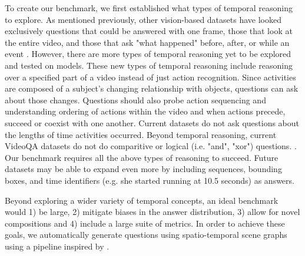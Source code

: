 \documentclass{article}
\newcommand{\mgm}[1]{{\color{cyan}{mgm: #1}}}
\begin{document}
To create our benchmark, we first established what types of temporal reasoning to explore. As mentioned previously, other vision-based datasets have looked exclusively questions that could be answered with one frame, those that look at the entire video, and those that ask "what happened" before, after, or while an event  \cite{tapaswi2016movieqa, lei2018tvqa, jang2017tgif, kim2017deepstory, xu2017video, maharaj2017dataset, zeng2016leveraging, yu2019activitynet}. However, there are more types of temporal reasoning yet to be explored and tested on models. These new types of temporal reasoning include reasoning over a specified part of a video instead of just action recognition. \mgm{rewrite sentence} Since activities are composed of a subject's changing relationship with objects, questions can ask about those changes. Questions should also probe action sequencing and understanding ordering of actions within the video and when actions precede, succeed or coexist with one another. Current datasets do not ask questions about the lengths of time activities occurred. Beyond temporal reasoning, current VideoQA datasets do not do comparitive or logical (i.e. "and", "xor") questions. \mgm{VG figure and talk about a little bit}. Our benchmark requires all the above types of reasoning to succeed. Future datasets may be able to expand even more by including sequences, bounding boxes, and time identifiers (e.g. she started running at 10.5 seconds) as answers.\mgm{I think make this a bullet list. Too weird for transition words}

Beyond exploring a wider variety of temporal concepts, an ideal benchmark would 1) be large, 2) mitigate biases in the answer distribution, 3) allow for novel compositions and 4) include a large suite of metrics. In order to achieve these goals, we automatically generate questions using spatio-temporal scene graphs using a pipeline inspired by \cite{hudson2019gqa}.
\end{document}

